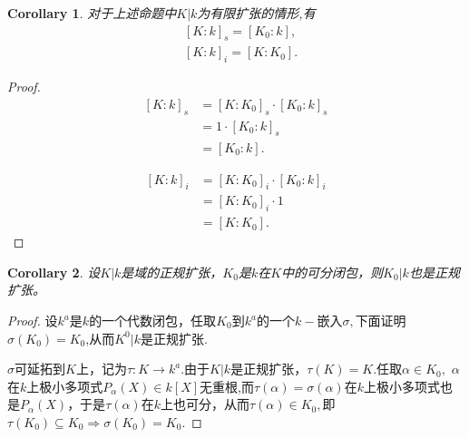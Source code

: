 \documentclass[UTF8]{article}
\newtheorem{cor}{Corollary}[section]
\begin{document}
\begin{cor}
对于上述命题中$K|k$为有限扩张的情形,有
\[
\begin{split}
&[K:k]_{s}=[K_{0}:k],\\
&[K:k]_{i}=[K:K_{0}].
\end{split}
\]
\end{cor}
\begin{proof}
	
	\[\begin{split}
	[K:k]_{s}&=[K:K_{0}]_{s}\cdot [K_{0}:k]_{s}\\
	&=1\cdot [K_{0}:k]_{s}\\
	&=[K_{0}:k].
	\end{split}		
	\]
	
	
	\[\begin{split}
	[K:k]_{i}&=[K:K_{0}]_{i}\cdot [K_{0}:k]_{i}\\
	&= [K:K_{0}]_{i}\cdot 1\\
	&=[K:K_{0}].
	\end{split}		
	\]
	
\end{proof}
\begin{cor}
设$K|k$是域的正规扩张，$K_{0}$是$k$在$K$中的可分闭包，则$K_{0}|k$也是正规扩张。
\end{cor}
\begin{proof}
	设$k^{a}$是$k$的一个代数闭包，任取$K_{0}$到$k^{a}$的一个$k-$嵌入$\sigma,$下面证明$\sigma(K_{0})=K_{0}$,从而$K^{0}|k$是正规扩张.
	
	
	$\sigma$可延拓到$K$上，记为$\tau:K\rightarrow k^{a}.$由于$K|k$是正规扩张，$\tau(K)=K.$任取$\alpha \in K_{0},$ $\alpha$在$k$上极小多项式$P_{\alpha}(X)\in k[X]$无重根,而$\tau(\alpha)=\sigma(\alpha)$在$k$上极小多项式也是$P_{\alpha}(X)$，于是$\tau(\alpha)$在$k$上也可分，从而$\tau(\alpha)\in K_{0},$即$\tau(K_{0})\subseteq K_{0}\Rightarrow \sigma(K_{0})=K_{0}.$
\end{proof}
\end{document}
